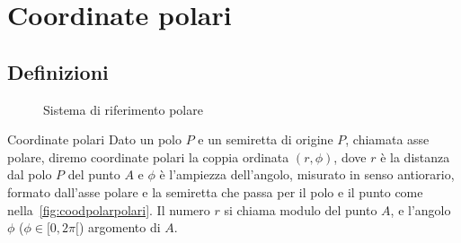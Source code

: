 \chapter{Coordinate polari}
\section{Definizioni}
\label{Cha:CoordinatePolariTrig}
\begin{figure} %
	\centering
	
	\caption{Sistema di riferimento polare}\label{fig:coodpolarpolari}
\end{figure}
\begin{definizionet}{Coordinate polari}{}
Dato un polo $P$ e un semiretta di origine $P$, chiamata asse polare, diremo coordinate polari la coppia ordinata $(r,\phi)$, dove $r$ è la distanza dal polo $P$ del punto $A$ e $\phi$ è l'ampiezza dell'angolo, misurato in senso antiorario, formato dall'asse polare e la semiretta che passa per il polo e il punto come nella~\vref{fig:coodpolarpolari}. Il numero $r$ si chiama modulo del punto $A$, e l'angolo $\phi$ ($\phi\in[0,2\pi[$) argomento di $A$. 
\end{definizionet}
